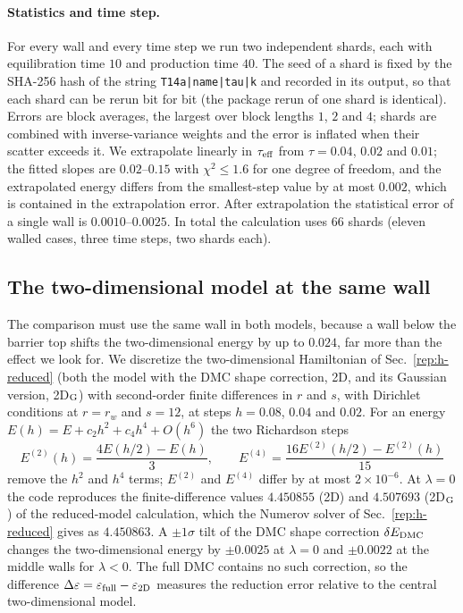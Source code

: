 \paragraph{Statistics and time step.}
For every wall and every time step we run two independent shards, each with equilibration time $10$ and production time $40$.
The seed of a shard is fixed by the SHA-256 hash of the string \texttt{T14a|name|tau|k} and recorded in its output, so that each shard can be rerun bit for bit (the package rerun of one shard is identical).
Errors are block averages, the largest over block lengths $1$, $2$ and $4$; shards are combined with inverse-variance weights and the error is inflated when their scatter exceeds it.
We extrapolate linearly in $\tau_{\rm eff}$ from $\tau=0.04$, $0.02$ and $0.01$; the fitted slopes are $0.02$--$0.15$ with $\chi^2\le1.6$ for one degree of freedom, and the extrapolated energy differs from the smallest-step value by at most $0.002$, which is contained in the extrapolation error. %
After extrapolation the statistical error of a single wall is $0.0010$--$0.0025$. %
In total the calculation uses $66$ shards (eleven walled cases, three time steps, two shards each).

\subsection{The two-dimensional model at the same wall}\label{sec:v18-2d}

The comparison must use the same wall in both models, because a wall below the barrier top shifts the two-dimensional energy by up to $0.024$, far more than the effect we look for.
We discretize the two-dimensional Hamiltonian of Sec.~\ref{rep:h-reduced} (both the model with the DMC shape correction, 2D, and its Gaussian version, 2D$_{\rm G}$) with second-order finite differences in $r$ and $s$, with Dirichlet conditions at $r=r_w$ and $s=12$, at steps $h=0.08$, $0.04$ and $0.02$.
For an energy $E(h)=E+c_2h^2+c_4h^4+O(h^6)$ the two Richardson steps
\begin{equation}
E^{(2)}(h)=\frac{4E(h/2)-E(h)}{3},\qquad E^{(4)}=\frac{16E^{(2)}(h/2)-E^{(2)}(h)}{15}
\label{eq:v18-richardson}
\end{equation}
remove the $h^2$ and $h^4$ terms; $E^{(2)}$ and $E^{(4)}$ differ by at most $2\times10^{-6}$. %
At $\lambda=0$ the code reproduces the finite-difference values $4.450855$ (2D) and $4.507693$ (2D$_{\rm G}$) of the reduced-model calculation, which the Numerov solver of Sec.~\ref{rep:h-reduced} gives as $4.450863$. %
A $\pm1\sigma$ tilt of the DMC shape correction $\delta E_{\rm DMC}$ changes the two-dimensional energy by $\pm0.0025$ at $\lambda=0$ and $\pm0.0022$ at the middle walls for $\lambda<0$. %
The full DMC contains no such correction, so the difference $\Delta\varepsilon=\varepsilon_{\rm full}-\varepsilon_{\rm 2D}$ measures the reduction error relative to the central two-dimensional model.

